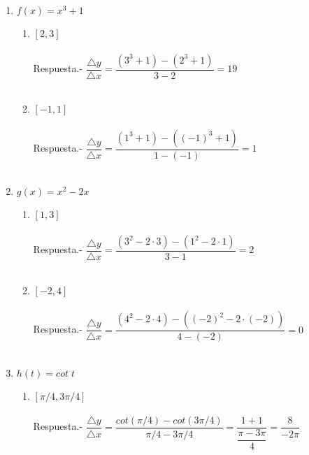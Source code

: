 \begin{enumerate}

\item $f(x) = x^3 + 1$ 
\begin{enumerate}[\bfseries a)]
    
    \item $[2,3]$\\\\
	Respuesta.-\; $\dfrac{\triangle y}{\triangle x} = \dfrac{(3^3 + 1) - (2^3 + 1)}{3 - 2} = 19$\\\\

    \item $[-1,1]$\\\\
	Respuesta.-\; $\dfrac{\triangle y}{\triangle x} = \dfrac{(1^3 + 1)-((-1)^3 + 1)}{1-(-1)} = 1$\\\\

\end{enumerate}

\item $g(x) = x^2 - 2x$
\begin{enumerate}[\bfseries a)]
    
    \item $[1,3]$\\\\
	Respuesta.-\; $\dfrac{\triangle y}{\triangle x} = \dfrac{(3^2 - 2\cdot 3) - (1^2 - 2\cdot 1)}{3-1} = 2 $\\\\ 
    
    \item $[-2,4]$\\\\
	Respuesta.-\; $\dfrac{\triangle y}{\triangle x} = \dfrac{(4^2 - 2\cdot 4) - ((-2)^2 - 2\cdot (-2))}{4-(-2)} = 0$\\\\

\end{enumerate}

\item $h(t) = cot \; t$
\begin{enumerate}[\bfseries (a)]

    \item $[\pi/4,3\pi/4]$\\\\
	Respuesta.-\; $\dfrac{\triangle y}{\triangle x} = \dfrac{cot(\pi/4)-cot(3\pi/4)}{\pi/4-3\pi/4} = \dfrac{1+1}{\dfrac{\pi - 3\pi}{4}} = \dfrac{8}{-2\pi}$\\\\


\end{enumerate}
\end{enumerate}
